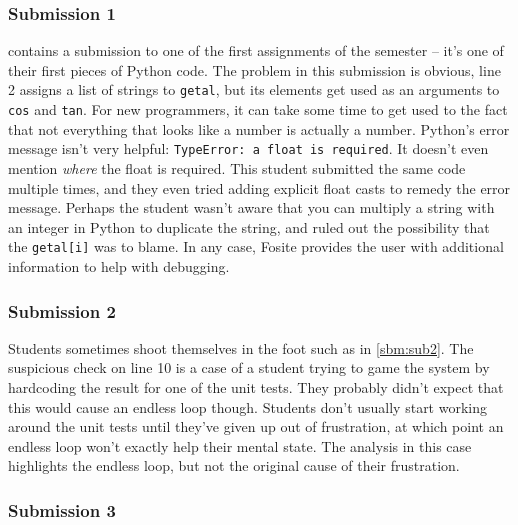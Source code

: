 \documentclass[a4paper, 16pt, oneside]{Thesis}
\begin{document}
\subsubsection{Submission 1}\label{submission-1}



\clearpage

 contains a submission to one of the first assignments of
the semester -- it's one of their first pieces of Python code. The
problem in this submission is obvious, line 2 assigns a list of strings
to \texttt{getal}, but its elements get used as an arguments to
\texttt{cos} and \texttt{tan}. For new programmers, it can take some
time to get used to the fact that not everything that looks like a
number is actually a number. Python's error message isn't very helpful:
\texttt{TypeError:\ a\ float\ is\ required}. It doesn't even mention
\emph{where} the float is required. This student submitted the same code
multiple times, and they even tried adding explicit float casts to
remedy the error message. Perhaps the student wasn't aware that you can
multiply a string with an integer in Python to duplicate the string, and
ruled out the possibility that the \texttt{getal{[}i{]}} was to blame.
In any case, Fosite provides the user with additional information to
help with debugging.

\subsubsection{Submission 2}\label{submission-2}



\clearpage

Students sometimes shoot themselves in the foot such as in
\cref{sbm:sub2}. The suspicious check on line 10 is a case of a student
trying to game the system by hardcoding the result for one of the unit
tests. They probably didn't expect that this would cause an endless loop
though. Students don't usually start working around the unit tests until
they've given up out of frustration, at which point an endless loop
won't exactly help their mental state. The analysis in this case
highlights the endless loop, but not the original cause of their
frustration.

\clearpage

\subsubsection{Submission 3}\label{submission-3}
\end{document}
